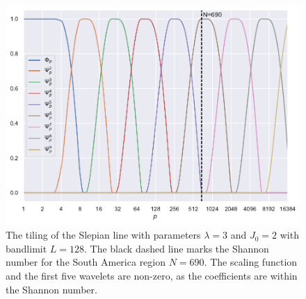 \begin{figure}[htpb]
	\centering\capstart{}
	\includegraphics[width=\textwidth]{south_america_slepian_tiling_L128.pdf}
	\caption[
		The tiling of the Slepian line for the South America region
	]{
		The tiling of the Slepian line with parameters \(\lambda=3\) and \(J_{0}=2\) with bandlimit \(L=128\).
		The black dashed line marks the Shannon number for the South America region \(N=690\).
		The scaling function and the first five wavelets are non-zero, as the coefficients are within the Shannon number.
	}\label{fig:chapter4_tiling}
\end{figure}
